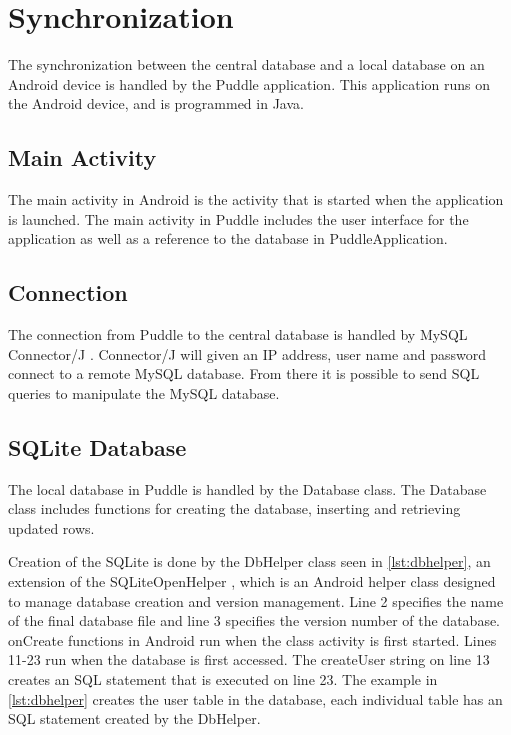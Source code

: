 \section{Synchronization}
The synchronization between the central database and a local database on an Android device is handled by the Puddle application. This application runs on the Android device, and is programmed in Java.

\subsection{Main Activity}
The main activity in Android is the activity that is started when the application is launched. The main activity in Puddle includes the user interface for the application as well as a reference to the database in PuddleApplication.

\subsection{Connection}
The connection from Puddle to the central database is handled by MySQL Connector/J \cite{mysqlconnectorj}. Connector/J will given an IP address, user name and password connect to a remote MySQL database. From there it is possible to send SQL queries to manipulate the MySQL database.

\subsection{SQLite Database}
The local database in Puddle is handled by the Database class. The Database class includes functions for creating the database, inserting and retrieving updated rows.

Creation of the SQLite is done by the DbHelper class seen in \autoref{lst:dbhelper}, an extension of the SQLiteOpenHelper \cite{sqliteopenhelper}, which is an Android helper class designed to manage database creation and version management. Line 2 specifies the name of the final database file and line 3 specifies the version number of the database.
onCreate functions in Android run when the class activity is first started. Lines 11-23 run when the database is first accessed. The createUser string on line 13 creates an SQL statement that is executed on line 23. The example in \autoref{lst:dbhelper} creates the user table in the database, each individual table has an SQL statement created by the DbHelper.



